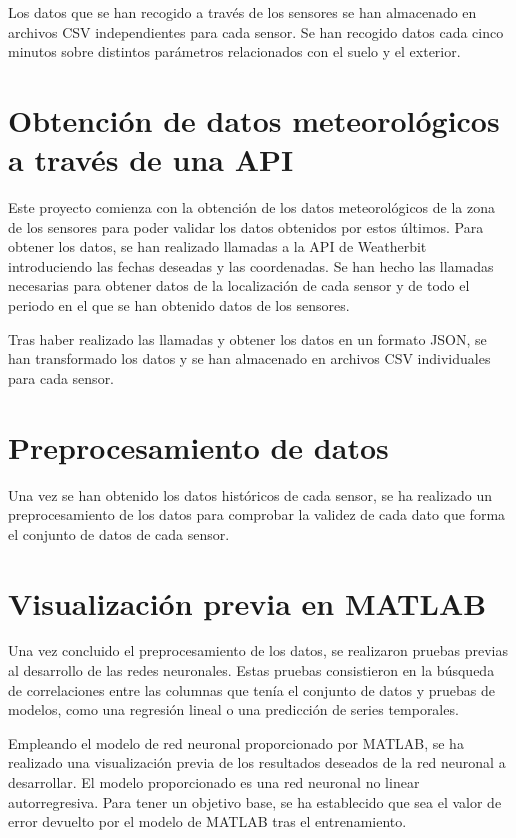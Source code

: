 Los datos que se han recogido a través de los sensores se han almacenado en archivos CSV independientes para cada sensor. Se han recogido datos cada cinco minutos sobre distintos parámetros relacionados con el suelo y el exterior.

\section{Obtención de datos meteorológicos a través de una API}

Este proyecto comienza con la obtención de los datos meteorológicos de la zona de los sensores para poder validar los datos obtenidos por estos últimos. Para obtener los datos, se han realizado llamadas a la API de Weatherbit introduciendo las fechas deseadas y las coordenadas. Se han hecho las llamadas necesarias para obtener datos de la localización de cada sensor y de todo el periodo en el que se han obtenido datos de los sensores.

\par

Tras haber realizado las llamadas y obtener los datos en un formato JSON, se han transformado los datos y se han almacenado en archivos CSV individuales para cada sensor.

\section{Preprocesamiento de datos}

Una vez se han obtenido los datos históricos de cada sensor, se ha realizado un preprocesamiento de los datos para comprobar la validez de cada dato que forma el conjunto de datos de cada sensor.

\section{Visualización previa en MATLAB}

Una vez concluido el preprocesamiento de los datos, se realizaron pruebas previas al desarrollo de las redes neuronales. Estas pruebas consistieron en la búsqueda de correlaciones entre las columnas que tenía el conjunto de datos y pruebas de modelos, como una regresión lineal o una predicción de series temporales.

\par

Empleando el modelo de red neuronal proporcionado por MATLAB, se ha realizado una visualización previa de los resultados deseados de la red neuronal a desarrollar. El modelo proporcionado es una red neuronal no linear autorregresiva. Para tener un objetivo base, se ha establecido que sea el valor de error devuelto por el modelo de MATLAB tras el entrenamiento.

